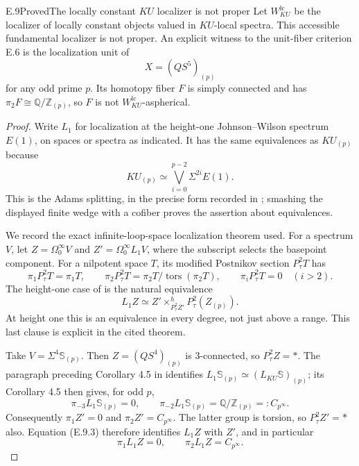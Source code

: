 \begin{claim}{E.9}{Proved}{The locally constant $KU$ localizer is not proper}
Let $W^{\mathrm{lc}}_{KU}$ be the localizer of locally constant
objects valued in $KU$-local spectra. This accessible fundamental
localizer is not proper. An explicit witness to the unit-fiber
criterion E.6 is the localization unit of
\[
                    X=(Q S^5)_{(p)}
                                                               \tag{E.9.1}
\]
for any odd prime $p$. Its homotopy fiber $F$ is simply connected
and has $\pi_2F\cong\mathbb Q/\mathbb Z_{(p)}$, so $F$ is not
$W^{\mathrm{lc}}_{KU}$-aspherical.
\end{claim}
\begin{proof}
Write $L_1$ for localization at the height-one Johnson--Wilson
spectrum $E(1)$, on spaces or spectra as indicated.
It has the same equivalences as $KU_{(p)}$ because
\[
                KU_{(p)}\simeq
                 \bigvee_{i=0}^{p-2}\Sigma^{2i}E(1).
                                                               \tag{E.9.2}
\]
This is the Adams splitting, in the precise form recorded in
\citet[Introduction, displayed splitting]{EH5BakerRichter2005};
smashing the displayed finite wedge with a cofiber proves the
assertion about equivalences.

We record the exact infinite-loop-space localization theorem used.
For a spectrum $V$, let $Z=\Omega^\infty_0V$ and
$Z'=\Omega^\infty_0L_1V$, where the subscript selects the
basepoint component. For a nilpotent space $T$, its modified
Postnikov section $P^2_{\tau}T$ has
\[
 \pi_1P^2_{\tau}T=\pi_1T,\qquad
 \pi_2P^2_{\tau}T=\pi_2T/\operatorname{tors}(\pi_2T),\qquad
 \pi_iP^2_{\tau}T=0\quad(i>2).
\]
The height-one case of
\citet[Theorem 8.1 and definition in Section 7]{EH5Bousfield2001}
is the natural equivalence
\[
 L_1 Z\simeq
      Z'\times^h_{P^2_{\tau}Z'}P^2_{\tau}(Z_{(p)}).
                                                               \tag{E.9.3}
\]
At height one this is an equivalence in every degree, not just
above a range. This last clause is explicit in the cited theorem.

Take $V=\Sigma^4\mathbb S_{(p)}$. Then
$Z=(QS^4)_{(p)}$ is 3-connected, so $P^2_{\tau}Z=*$.
The paragraph preceding Corollary 4.5 in
\citet{EH5Bousfield1979} identifies
$L_1\mathbb S_{(p)}\simeq(L_{KU}\mathbb S)_{(p)}$;
its Corollary 4.5 then gives, for odd $p$,
\[
 \pi_{-3}L_1\mathbb S_{(p)}=0,
 \qquad
 \pi_{-2}L_1\mathbb S_{(p)}
                  =\mathbb Q/\mathbb Z_{(p)}=:C_{p^\infty}.
                                                               \tag{E.9.4}
\]
Consequently $\pi_1Z'=0$ and $\pi_2Z'=C_{p^\infty}$.
The latter group is torsion, so $P^2_{\tau}Z'=*$ also.
Equation (E.9.3) therefore identifies $L_1Z$ with $Z'$,
and in particular
\[
             \pi_1L_1Z=0,\qquad
             \pi_2L_1Z=C_{p^\infty}.                    \tag{E.9.5}
\]


\end{proof}
